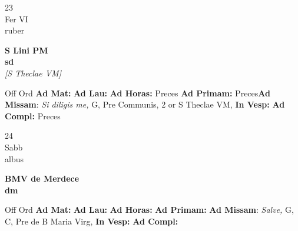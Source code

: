 \documentclass[10pt, openany]{book}
\begin{document}
    \begin{center}
        \begin{minipage}{3.5in}
            \vspace{2em}
            \begin{minipage}{0.5in}
                {\Huge 23} \\
                {\normalsize Fer VI} \\
                {\normalsize ruber}
            \end{minipage}
            \begin{minipage}{3.0in}
                \textbf{ \large S Lini PM \\
                \textnormal{\normalsize sd}} \\ \textit{[S Theclae VM]} \\ 
            \end{minipage}
            \begin{justify}Off Ord
                \textbf{Ad Mat: }
                \textbf{Ad Lau: }
                \textbf{Ad Horas: }Preces
                \textbf{Ad Primam: }Preces\textbf{Ad Missam}: \textit{Si diligis me,} G, Pre Communis, 2 or S Theclae VM,  
                \textbf{In Vesp: }
                \textbf{Ad Compl: }Preces
            \end{justify}
        \end{minipage}
    \end{center}

    \begin{center}
        \begin{minipage}{3.5in}
            \vspace{2em}
            \begin{minipage}{0.5in}
                {\Huge 24} \\
                {\normalsize Sabb} \\
                {\normalsize albus}
            \end{minipage}
            \begin{minipage}{3.0in}
                \textbf{ \large BMV de Merdece \\
                \textnormal{\normalsize dm}} \\ 
            \end{minipage}
            \begin{justify}Off Ord
                \textbf{Ad Mat: }
                \textbf{Ad Lau: }
                \textbf{Ad Horas: }
                \textbf{Ad Primam: }\textbf{Ad Missam}: \textit{Salve,} G, C, Pre de B Maria Virg,  
                \textbf{In Vesp: }
                \textbf{Ad Compl: }
            \end{justify}
        \end{minipage}
    \end{center}
\end{document}
